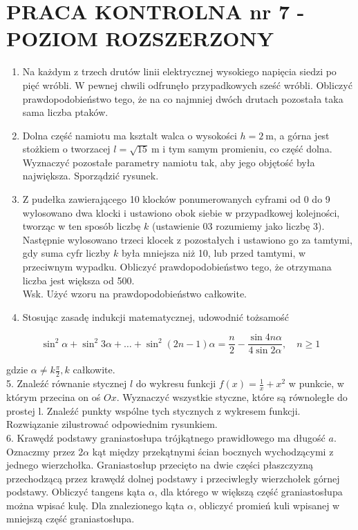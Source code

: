\documentclass[10pt]{article}
\begin{document}
\section*{PRACA KONTROLNA nr 7 -POZIOM ROZSZERZONY}
\begin{enumerate}
  \item Na każdym z trzech drutów linii elektrycznej wysokiego napięcia siedzi po pięć wróbli. W pewnej chwili odfrunęło przypadkowych sześć wróbli. Obliczyć prawdopodobieństwo tego, że na co najmniej dwóch drutach pozostała taka sama liczba ptaków.
  \item Dolna część namiotu ma ksztalt walca o wysokości $h=2 \mathrm{~m}$, a górna jest stożkiem o tworzacej $l=\sqrt{15} \mathrm{~m}$ i tym samym promieniu, co część dolna. Wyznaczyć pozostałe parametry namiotu tak, aby jego objętość była największa. Sporządzić rysunek.
  \item Z pudełka zawierającego 10 klocków ponumerowanych cyframi od 0 do 9 wylosowano dwa klocki i ustawiono obok siebie w przypadkowej kolejności, tworząc w ten sposób liczbę $k$ (ustawienie 03 rozumiemy jako liczbę 3). Następnie wylosowano trzeci klocek z pozostałych i ustawiono go za tamtymi, gdy suma cyfr liczby $k$ była mniejsza niż 10, lub przed tamtymi, w przeciwnym wypadku. Obliczyć prawdopodobieństwo tego, że otrzymana liczba jest większa od 500.\\
Wsk. Użyć wzoru na prawdopodobieństwo całkowite.
  \item Stosując zasadę indukcji matematycznej, udowodnić tożsamość
\end{enumerate}

$$
\sin ^{2} \alpha+\sin ^{2} 3 \alpha+\ldots+\sin ^{2}(2 n-1) \alpha=\frac{n}{2}-\frac{\sin 4 n \alpha}{4 \sin 2 \alpha}, \quad n \geqslant 1
$$

gdzie $\alpha \neq k \frac{\pi}{2}, k$ całkowite.\\
5. Znaleźć równanie stycznej $l$ do wykresu funkcji $f(x)=\frac{1}{x}+x^{2}$ w punkcie, w którym przecina on oś $O x$. Wyznaczyć wszystkie styczne, które są równoległe do prostej l. Znaleźć punkty wspólne tych stycznych z wykresem funkcji. Rozwiązanie zilustrować odpowiednim rysunkiem.\\
6. Krawędź podstawy graniastosłupa trójkątnego prawidłowego ma długość $a$. Oznaczmy przez $2 \alpha$ kąt między przekątnymi ścian bocznych wychodzącymi z jednego wierzchołka. Graniastosłup przecięto na dwie części płaszczyzną przechodzącą przez krawędź dolnej podstawy i przeciwległy wierzchołek górnej podstawy. Obliczyć tangens kąta $\alpha$, dla którego w większą część graniastosłupa można wpisać kulę. Dla znalezionego kąta $\alpha$, obliczyć promień kuli wpisanej w mniejszą część graniastosłupa.
\end{document}

